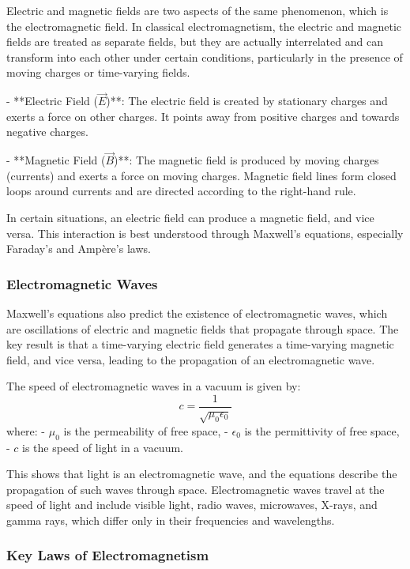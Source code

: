 \documentclass{article}
\begin{document}
Electric and magnetic fields are two aspects of the same phenomenon, which is the electromagnetic field. In classical electromagnetism, the electric and magnetic fields are treated as separate fields, but they are actually interrelated and can transform into each other under certain conditions, particularly in the presence of moving charges or time-varying fields.

- **Electric Field (\( \vec{E} \))**: The electric field is created by stationary charges and exerts a force on other charges. It points away from positive charges and towards negative charges.
  
- **Magnetic Field (\( \vec{B} \))**: The magnetic field is produced by moving charges (currents) and exerts a force on moving charges. Magnetic field lines form closed loops around currents and are directed according to the right-hand rule.

In certain situations, an electric field can produce a magnetic field, and vice versa. This interaction is best understood through Maxwell's equations, especially Faraday’s and Ampère’s laws.

\subsubsection*{Electromagnetic Waves}

Maxwell's equations also predict the existence of electromagnetic waves, which are oscillations of electric and magnetic fields that propagate through space. The key result is that a time-varying electric field generates a time-varying magnetic field, and vice versa, leading to the propagation of an electromagnetic wave.

The speed of electromagnetic waves in a vacuum is given by:
\[
c = \frac{1}{\sqrt{\mu_0 \epsilon_0}}
\]
where:
- \( \mu_0 \) is the permeability of free space,
- \( \epsilon_0 \) is the permittivity of free space,
- \( c \) is the speed of light in a vacuum.

This shows that light is an electromagnetic wave, and the equations describe the propagation of such waves through space. Electromagnetic waves travel at the speed of light and include visible light, radio waves, microwaves, X-rays, and gamma rays, which differ only in their frequencies and wavelengths.

\subsubsection*{Key Laws of Electromagnetism}
\end{document}
